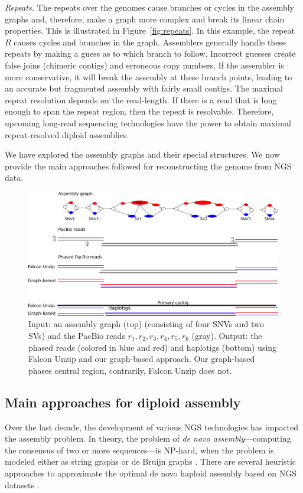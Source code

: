 \textit{Repeats.} The repeats over the genomes cause branches or cycles in the assembly graphs and, therefore, make a graph more complex and break its linear chain properties.
This is illustrated in Figure~\ref{fig:repeats}. In this example, the repeat $R$ causes cycles and branches in the graph.
Assemblers generally handle these repeats by making a guess as to which branch to follow.
Incorrect guesses create false joins (chimeric contigs) and erroneous copy numbers. 
If the assembler is more conservative, it will break the assembly at these branch points, leading to an accurate but fragmented assembly with fairly small contigs.
The maximal repeat resolution  depends on the read-length. If there is a read that is long enough to span the repeat region, then the repeat is resolvable.
Therefore, upcoming long-read sequencing technologies have the power to obtain maximal repeat-resolved diploid assemblies.

We have explored the assembly graphs and their special structures. We now provide the main approaches followed for reconstructing the genome from NGS data. 
\begin{figure}[t!]\centering
\includegraphics[width=\columnwidth]{ex_graph_approach.pdf}
\caption{Input: an assembly graph (top) (consisting of four SNVs and two SVs) and the PacBio reads $r_1, r_2, r_3, r_4, r_5, r_6$ (gray). 
Output: the phased reads (colored in blue and red) and haplotigs (bottom) using Falcon Unzip and our graph-based approach. Our graph-based phases central region, contrarily, Falcon Unzip does not.  }
\label{fig:ex_graph_approach}
\end{figure}

\subsection{Main approaches for diploid assembly}
Over the last decade, the development of various NGS technologies has impacted the assembly problem.
In theory, the problem of \textit{de novo assembly}---computing the consensus of two or more sequences---is NP-hard, when the problem is modeled either as string graphs or de Bruijn graphs \citep{medvedev2007computability}. 
There are several heuristic approaches to approximate the optimal de novo haploid assembly based on NGS datasets \citep{idury1995new, myers1995toward, myers2005fragment, pevzner2001eulerian, nagarajan2009parametric, nagarajan2013sequence, sovic2013approaches}.

